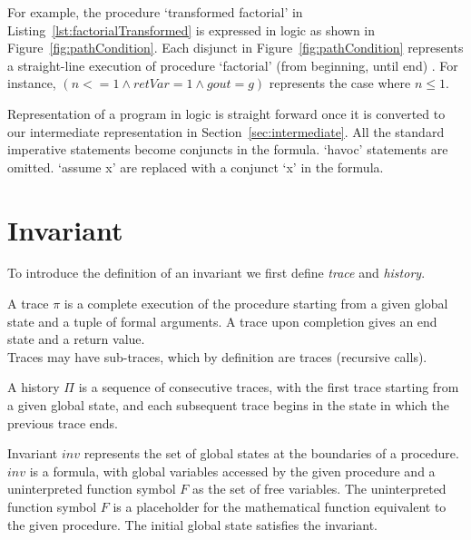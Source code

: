 \documentclass{llncs}
\newcommand{\foo}{\textit{foo}}
\newcommand{\trace}{\pi}
\newcommand{\inv}{\mathit{inv}}
\newcommand{\history}{\Pi}
\newcommand{\pathCondition}{\mathit{T_{\foo}}}
\newcommand{\F}{\mathit{F}}
\begin{document}
For example, the procedure `transformed factorial' in
Listing~\ref{lst:factorialTransformed} is expressed in logic as shown
in Figure~\ref{fig:pathCondition}. Each disjunct in
Figure~\ref{fig:pathCondition} represents a straight-line execution of
procedure `factorial' (from beginning, until end) . For instance, $(n
<= 1 \wedge retVar = 1 \wedge gout = g)$ represents the case where $n
\leq 1$.

Representation of a program in logic is straight forward once it is
converted to our intermediate representation in
Section~\ref{sec:intermediate}. All the standard imperative statements
become conjuncts in the formula. `havoc' statements are omitted.
`assume x' are replaced with a conjunct `x' in the formula.

\section{Invariant}

To introduce the definition of an invariant we first define
\textit{trace} and \textit{history}.

\begin{definition}[trace]
  A trace $\trace$ is a complete execution of the procedure starting
  from a given global state and a tuple of formal arguments. A trace
  upon completion gives an end state and a return value.\\ Traces may
  have sub-traces, which by definition are traces (recursive calls).
\end{definition}

\begin{definition}[history]
  A history $\history$ is a sequence of consecutive traces, with the
  first trace starting from a given global state, and each subsequent
  trace begins in the state in which the previous trace ends.
\end{definition}

\begin{definition}[invariant]
  Invariant $\inv$ represents the set of global states at the
  boundaries of a procedure. $\inv$ is a formula, with global
  variables accessed by the given procedure and a uninterpreted
  function symbol $\F$ as the set of free variables. The uninterpreted
  function symbol $\F$ is a placeholder for the mathematical function
  equivalent to the given procedure. The initial global state
  satisfies the invariant.
\end{definition}
\end{document}
